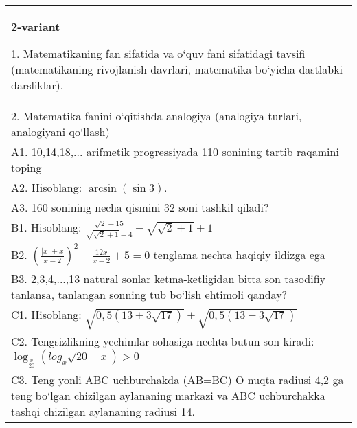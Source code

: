 \documentclass{article}
\begin{document}
\begin{tabular}{m{17cm}}
\textbf{2-variant}

1. Matematikaning fan sifatida va o‘quv fani sifatidagi tavsifi (matematikaning rivojlanish davrlari, matematika bo‘yicha dastlabki darsliklar). \\
2. Matematika fanini o‘qitishda analogiya (analogiya turlari, analogiyani qo‘llash) \\
A1. 10,14,18,... arifmetik progressiyada 110 sonining tartib raqamini toping \\
A2. Hisoblang: \(\arcsin (\sin3) \). \\
A3. 160 sonining necha qismini 32 soni tashkil qiladi? \\
B1. Hisoblang: \(\frac{\sqrt{2} - 15}{\sqrt{\sqrt{2} + 1} - 4} - \sqrt{\sqrt{2} + 1} + 1\) \\
B2. $ (\frac{|x| + x}{x-2}) ^{2} - \frac{12x}{x-2} + 5 = 0$ tenglama nechta haqiqiy ildizga ega \\
B3. 2,3,4,...,13 natural sonlar ketma-ketligidan bitta son tasodifiy tanlansa, tanlangan sonning tub bo‘lish ehtimoli qanday? \\
C1. Hisoblang: \(\sqrt{0,5 (13 + 3\sqrt{17}) } + \sqrt{0,5 (13 - 3\sqrt{17}) }\) \\
C2. Tengsizlikning yechimlar sohasiga nechta butun son kiradi: \(\log_{\frac{x}{20}} (log_{x}\sqrt{20 - x}) > 0\) \\
C3. Teng yonli ABC uchburchakda (AB=BC) O nuqta radiusi 4,2 ga teng bo‘lgan chizilgan aylananing markazi va ABC uchburchakka tashqi chizilgan aylananing radiusi 14. \\

\end{tabular}
\vspace{1cm}
\end{document}
